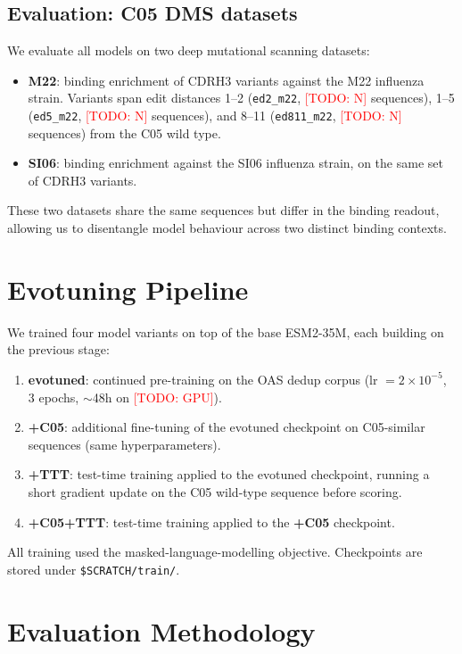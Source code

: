\documentclass[11pt, a4paper]{article}
\newcommand{\todo}[1]{\textcolor{red}{[TODO: #1]}}
\begin{document}
\subsection{Evaluation: C05 DMS datasets}

We evaluate all models on two deep mutational scanning datasets:

\begin{itemize}[nosep]
    \item \textbf{M22}: binding enrichment of CDRH3 variants against the M22 influenza strain. Variants span edit distances 1--2 (\texttt{ed2\_m22}, \todo{N} sequences), 1--5 (\texttt{ed5\_m22}, \todo{N} sequences), and 8--11 (\texttt{ed811\_m22}, \todo{N} sequences) from the C05 wild type.
    \item \textbf{SI06}: binding enrichment against the SI06 influenza strain, on the same set of CDRH3 variants.
\end{itemize}

These two datasets share the same sequences but differ in the binding readout, allowing us to disentangle model behaviour across two distinct binding contexts.


\section{Evotuning Pipeline}

We trained four model variants on top of the base ESM2-35M, each building on the previous stage:

\begin{enumerate}[nosep]
    \item \textbf{evotuned}: continued pre-training on the OAS dedup corpus (lr $= 2{\times}10^{-5}$, 3 epochs, $\sim$48h on \todo{GPU}).
    \item \textbf{+C05}: additional fine-tuning of the evotuned checkpoint on C05-similar sequences (same hyperparameters).
    \item \textbf{+TTT}: test-time training applied to the evotuned checkpoint, running a short gradient update on the C05 wild-type sequence before scoring.
    \item \textbf{+C05+TTT}: test-time training applied to the \textbf{+C05} checkpoint.
\end{enumerate}

All training used the masked-language-modelling objective. Checkpoints are stored under \texttt{\$SCRATCH/train/}.


\section{Evaluation Methodology}
\end{document}
